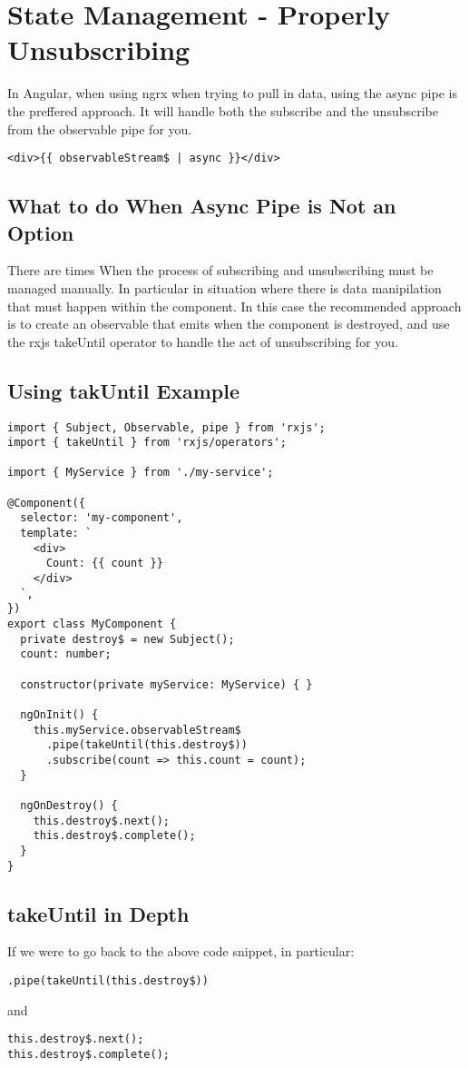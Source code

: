 \maketitle{}
\section{ State Management - Properly Unsubscribing }

In Angular, when using ngrx when trying to pull in data, using the async pipe is
the preffered approach. It will handle both the subscribe and the unsubscribe
from the observable pipe for you.

\begin{lstlisting}
<div>{{ observableStream$ | async }}</div>
\end{lstlisting}

\subsection{ What to do When Async Pipe is Not an Option }
There are times When the process of subscribing and unsubscribing must be
managed manually. In particular in situation where there is data manipilation
that must happen within the component. In this case the recommended approach
is to create an observable that emits when the component is destroyed, and use
the rxjs takeUntil operator to handle the act of unsubscribing for you.

\subsection{Using takUntil Example}

\begin{lstlisting}
import { Subject, Observable, pipe } from 'rxjs';
import { takeUntil } from 'rxjs/operators';

import { MyService } from './my-service';

@Component({
  selector: 'my-component',
  template: `
    <div>
      Count: {{ count }}
    </div>
  `,
})
export class MyComponent {
  private destroy$ = new Subject();
  count: number;

  constructor(private myService: MyService) { }

  ngOnInit() {
    this.myService.observableStream$
      .pipe(takeUntil(this.destroy$))
      .subscribe(count => this.count = count);
  }

  ngOnDestroy() {
    this.destroy$.next();
    this.destroy$.complete();
  }
}
\end{lstlisting}

\subsection{takeUntil in Depth}

If we were to go back to the above code snippet, in particular:
\begin{verbatim}
.pipe(takeUntil(this.destroy$))
\end{verbatim}
and
\begin{verbatim}
this.destroy$.next();
this.destroy$.complete();
\end{verbatim}
